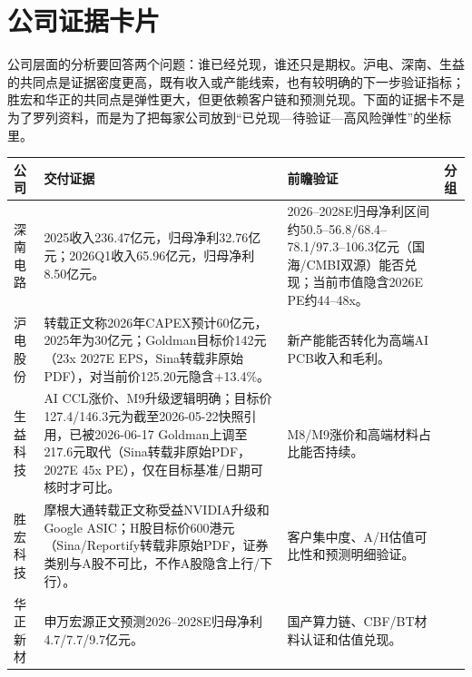 \section{公司证据卡片}

公司层面的分析要回答两个问题：谁已经兑现，谁还只是期权。沪电、深南、生益的共同点是证据密度更高，既有收入或产能线索，也有较明确的下一步验证指标；胜宏和华正的共同点是弹性更大，但更依赖客户链和预测兑现。下面的证据卡不是为了罗列资料，而是为了把每家公司放到“已兑现—待验证—高风险弹性”的坐标里。

\begin{exhibitbox}[图表6-1：核心公司证据卡片]
\small
\begin{tabularx}{\textwidth}{L{2.2cm}X X L{2.2cm}}
\toprule
\textbf{公司} & \textbf{交付证据} & \textbf{前瞻验证} & \textbf{分组} \\
\midrule
深南电路 & 2025收入236.47亿元，归母净利32.76亿元；2026Q1收入65.96亿元，归母净利8.50亿元。 & 2026--2028E归母净利区间约50.5--56.8/68.4--78.1/97.3--106.3亿元（国海/CMBI双源）能否兑现；当前市值隐含2026E PE约44--48x。 &  \\
沪电股份 & 转载正文称2026年CAPEX预计60亿元，2025年为30亿元；Goldman目标价142元（23x 2027E EPS，Sina转载非原始PDF），对当前价125.20元隐含+13.4\%。 & 新产能能否转化为高端AI PCB收入和毛利。 &  \\
生益科技 & AI CCL涨价、M9升级逻辑明确；目标价127.4/146.3元为截至2026-05-22快照引用，已被2026-06-17 Goldman上调至217.6元取代（Sina转载非原始PDF，2027E 45x PE），仅在目标基准/日期可核时才可比。 & M8/M9涨价和高端材料占比能否持续。 &  \\
胜宏科技 & 摩根大通转载正文称受益NVIDIA升级和Google ASIC；H股目标价600港元（Sina/Reportify转载非原始PDF，证券类别与A股不可比，不作A股隐含上行/下行）。 & 客户集中度、A/H估值可比性和预测明细验证。 &  \\
华正新材 & 申万宏源正文预测2026--2028E归母净利4.7/7.7/9.7亿元。 & 国产算力链、CBF/BT材料认证和估值兑现。 &  \\
\bottomrule
\end{tabularx}
\end{exhibitbox}

